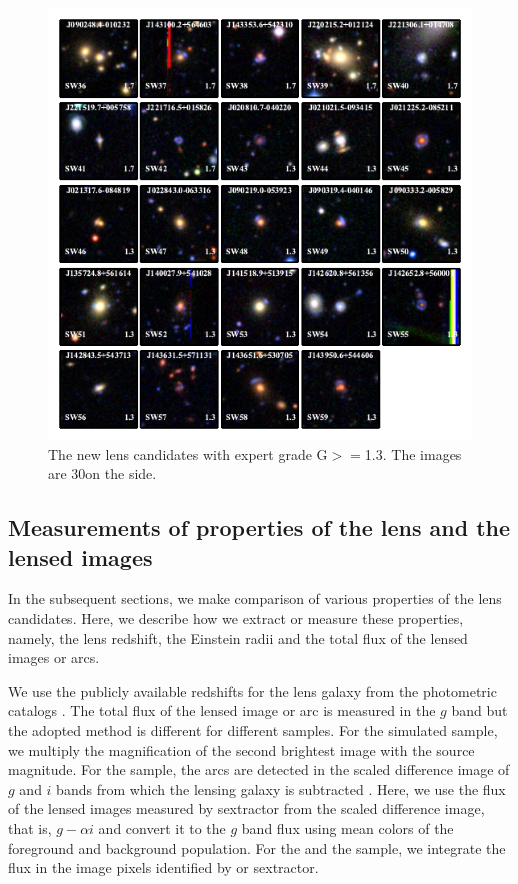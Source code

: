\documentclass[useAMS,usenatbib,a4paper]{mn2e}
\begin{document}
\begin{figure}
\begin{center}
\includegraphics[scale=1.9]{lenscandfin_1.pdf}
\caption{ \label{fig:lc}
The new \sw lens candidates with expert grade G$>=$1.3. The images are
30\arcsec on the side.
}
\end{center}
\end{figure}

\subsection{Measurements of properties of the lens and the lensed images}
\label{sec:results:meas}

In the subsequent sections, we make comparison of various properties of the lens
candidates. Here, we describe how we extract or measure these properties, namely,
the lens redshift, the Einstein radii and the total flux of the lensed images or
arcs.

We use the publicly available redshifts for the lens galaxy from the
\cfhtls photometric catalogs \citep{Coupon2009}. The total flux of the
lensed image or arc is measured in the $g$ band but the adopted method
is different for different samples. For the simulated sample, we
multiply the magnification of the second brightest image with the source
magnitude. For the \rf sample, the arcs are detected in the scaled
difference image of $g$ and $i$ bands from which the lensing galaxy is
subtracted \citep[for details, see][]{Gavazzi2014}. Here, we use the flux
of the lensed images measured by {\sc sextractor} from the scaled
difference image, that is, $g-\alpha i$ and convert it to the $g$ band
flux using mean colors of the foreground and background population. For
the \af and the \sw sample, we integrate the flux in the image pixels
identified by \af or {\sc sextractor}.
\end{document}
